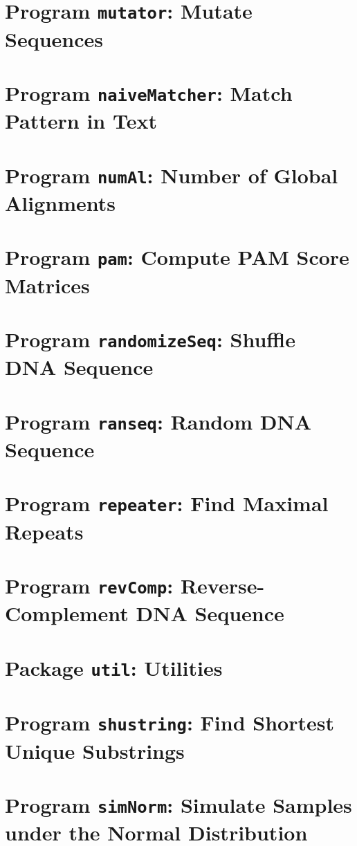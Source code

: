 \documentclass[a4paper]{report}
\begin{document}
\chapter{Program \texttt{mutator}: Mutate Sequences}\label{ch:mut}

\chapter{Program \texttt{naiveMatcher}: Match Pattern in
  Text}\label{ch:nm}

\chapter{Program \texttt{numAl}: Number of Global Alignments}\label{ch:num}

\chapter{Program \texttt{pam}: Compute PAM Score
  Matrices}\label{ch:pam}

\chapter{Program \texttt{randomizeSeq}: Shuffle DNA
  Sequence}\label{ch:rs}

\chapter{Program \texttt{ranseq}: Random DNA Sequence}\label{ch:ran}

\chapter{Program \texttt{repeater}: Find Maximal
  Repeats}\label{ch:rep}

\chapter{Program \texttt{revComp}: Reverse-Complement DNA
  Sequence}\label{ch:rev}

\chapter{Package \texttt{util}: Utilities}\label{ch:uti}

\chapter{Program \texttt{shustring}: Find Shortest Unique Substrings}\label{ch:shu}

\chapter{Program \texttt{simNorm}: Simulate Samples under the Normal
  Distribution}\label{ch:sn}

\end{document}
